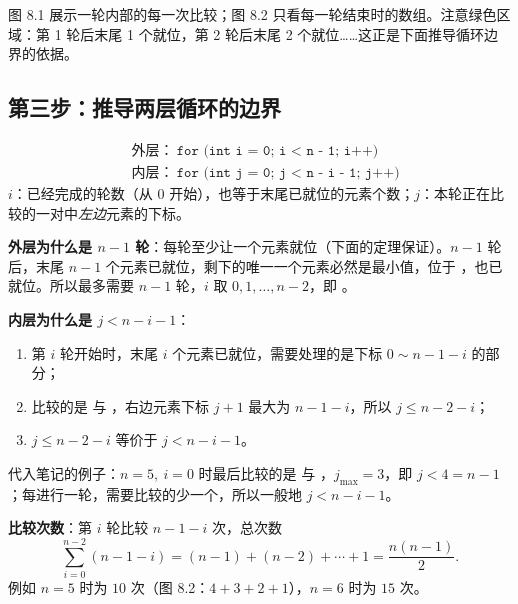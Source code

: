 \begin{center}
\end{center}
图 8.1 展示一轮内部的每一次比较；图 8.2 只看每一轮结束时的数组。注意绿色区域：第 1 轮后末尾 1 个就位，第 2 轮后末尾 2 个就位……这正是下面推导循环边界的依据。

\subsection{第三步：推导两层循环的边界}
\begin{formulabox}
\[
\boxed{\begin{aligned}
&\text{外层：}\ \texttt{for (int i = 0; i < n - 1; i++)}\\
&\text{内层：}\ \texttt{for (int j = 0; j < n - i - 1; j++)}
\end{aligned}}
\]
{\small $i$：已经完成的轮数（从 0 开始），也等于末尾已就位的元素个数；$j$：本轮正在比较的一对中\emph{左边}元素的下标。}
\end{formulabox}

\begin{proofbox}[推导（笔记 §7.8 “理解”部分的补全）]
\textbf{外层为什么是 $n-1$ 轮}：每轮至少让一个元素就位（下面的定理保证）。$n-1$ 轮后，末尾 $n-1$ 个元素已就位，剩下的唯一一个元素必然是最小值，位于 ，也已就位。所以最多需要 $n-1$ 轮，$i$ 取 $0,1,\dots,n-2$，即 。

\textbf{内层为什么是 $j<n-i-1$}：
\begin{enumerate}[leftmargin=1.5em]
  \item 第 $i$ 轮开始时，末尾 $i$ 个元素已就位，需要处理的是下标 $0\sim n-1-i$ 的部分；
  \item 比较的是  与 ，右边元素下标 $j+1$ 最大为 $n-1-i$，所以 $j\le n-2-i$；
  \item $j\le n-2-i$ 等价于 $j<n-i-1$。
\end{enumerate}
代入笔记的例子：$n=5,\ i=0$ 时最后比较的是  与 ，$j_{\max}=3$，即 $j<4=n-1$；每进行一轮，需要比较的少一个，所以一般地 $j<n-i-1$。

\textbf{比较次数}：第 $i$ 轮比较 $n-1-i$ 次，总次数
\[
\sum_{i=0}^{n-2}(n-1-i)=(n-1)+(n-2)+\cdots+1=\frac{n(n-1)}{2}.
\]
例如 $n=5$ 时为 $10$ 次（图 8.2：$4+3+2+1$），$n=6$ 时为 $15$ 次。
\end{proofbox}

